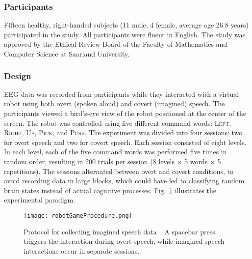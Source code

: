 \documentclass[onecolumn]{IEEEtran}
\begin{document}
\subsubsection{Participants}
Fifteen healthy, right-handed subjects (11 male, 4 female, average age 26.8 years) participated in the study. 
All participants were fluent in English. 
The study was approved by the Ethical Review Board 
of the Faculty of Mathematics and Computer Science at Saarland University.

\subsubsection{Design} 
EEG data was recorded from participants 
while they interacted with a virtual robot using both overt (spoken aloud) and covert (imagined) speech.
The participants viewed a bird's-eye view of the robot positioned at the center of the screen. 
The robot was controlled using five different command words:
\textsc{Left}, \textsc{Right}, \textsc{Up}, \textsc{Pick}, and \textsc{Push}.
The experiment was divided into four sessions: 
two for overt speech and two for covert speech. 
Each session consisted of eight levels. 
In each level, each of the five command words was performed five times in random order, 
resulting in 200 trials per session (8 levels $\times$ 5 words $\times$ 5 repetitions).
The sessions alternated between overt and covert conditions, to avoid recording data in large blocks, 
which could have led to classifying random brain states instead of actual cognitive processes.
Fig.~\ref{fig:interactionRobotGame} illustrates the experimental paradigm. 

\begin{figure}[!ht]
\centerline{\texttt{[image: robotGameProcedure.png]}}
\caption{
    Protocol for collecting imagined speech data~\cite{mohamed2024speech}.
    A spacebar press triggers the interaction during overt speech, 
    while imagined speech interactions occur in separate sessions.
}
\label{fig:interactionRobotGame}
\end{figure}
\end{document}
